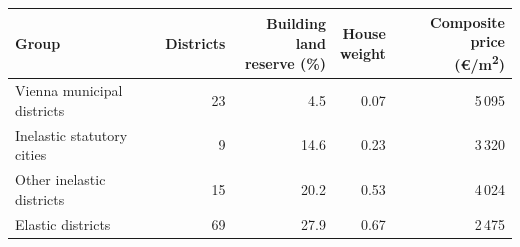 \begin{tabular}{l r r r r}
\toprule
Group & Districts & \makecell{Building land\\reserve (\%)} & \makecell{House\\weight} & \makecell{Composite price\\(\euro/m\textsuperscript{2})} \\
\midrule
Vienna municipal districts & 23 & 4.5 & 0.07 & 5\,095 \\
Inelastic statutory cities & 9 & 14.6 & 0.23 & 3\,320 \\
Other inelastic districts & 15 & 20.2 & 0.53 & 4\,024 \\
Elastic districts & 69 & 27.9 & 0.67 & 2\,475 \\
\bottomrule
\end{tabular}
